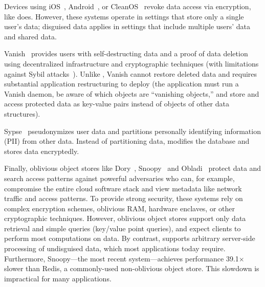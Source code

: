 %
Devices using iOS~\cite{applesecurity}, Android~\cite{applesecurity}, or
CleanOS~\cite{cleanos} revoke data access via encryption, like \sys does.
%
However, these systems operate in settings that store only a single user's data;
disguised data applies in settings that include multiple users' data and shared
data.
%

%
Vanish~\cite{vanish} provides users with self-destructing data and a proof of
data deletion using decentralized infrastructure and cryptographic techniques
(with limitations against Sybil attacks~\cite{defeat_vanish}). Unlike \sys,
Vanish cannot restore deleted data and requires substantial application
restructuring to deploy (\eg the application must run a Vanish daemon, be aware of which
objects are ``vanishing objects,'' and store and access protected data
as key-value pairs instead of objects of other data structures).
%

%
Sypse~\cite{sypse} pseudonymizes user data and partitions personally identifying
information (PII) from other data. Instead of partitioning data, \sys modifies
the database and stores \xxed data encryptedly.
%

%
Finally, oblivious object stores like Dory~\cite{dory}, Snoopy~\cite{snoopy} and
Obladi~\cite{obladi} protect data and search access patterns against powerful
adversaries who can, for example, compromise the entire cloud software stack and
view metadata like network traffic and access patterns. To provide strong
security, these systems rely on complex encryption schemes, oblivious RAM,
hardware enclaves, or other cryptographic techniques.
%
However, oblivious object stores support only data retrieval and simple queries
(\eg key/value point queries), and expect clients to perform most 
computations on data.
%
By contrast, \sys supports arbitrary server-side processing of undisguised
data, which most applications today require. 
%
Furthermore, Snoopy---the most recent system---achieves performance 39.1$\times$ slower than Redis, a
commonly-used non-oblivious object store. This slowdown is impractical for many 
applications.


%
%
%

